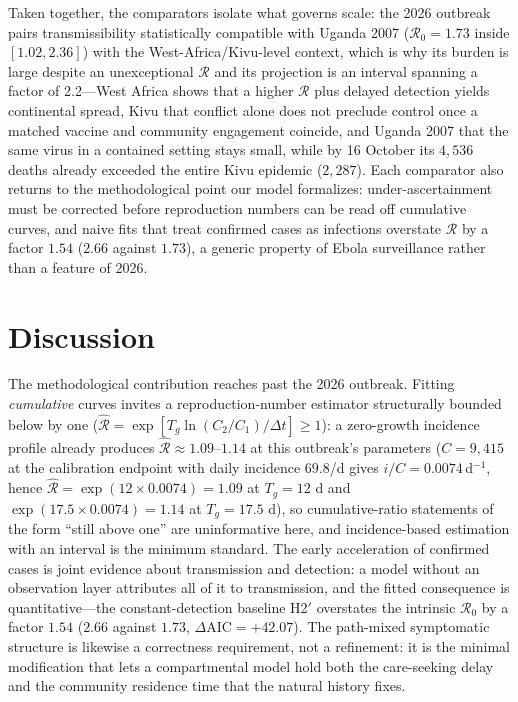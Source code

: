 \documentclass[preprint,12pt,numbers]{elsarticle}
\newcommand{\Reff}{\mathcal{R}}
\begin{document}
Taken together, the comparators isolate what governs scale: the 2026
outbreak pairs transmissibility statistically compatible with Uganda
2007 ($\Reff_0=1.73$ inside $[1.02,2.36]$) with the
West-Africa/Kivu-level context, which is why its burden is large despite
an unexceptional $\Reff$ and its projection is an interval spanning a
factor of 2.2---West Africa shows that a higher $\Reff$ plus delayed
detection yields continental spread, Kivu that conflict alone does not
preclude control once a matched vaccine and community engagement
coincide, and Uganda 2007 that the same virus in a contained setting
stays small, while by 16 October its $4{,}536$ deaths already exceeded
the entire Kivu epidemic ($2{,}287$). Each comparator also returns to
the methodological point our model formalizes: under-ascertainment must
be corrected before reproduction numbers can be read off cumulative
curves, and naive fits that treat confirmed cases as infections
overstate $\Reff$ by a factor $1.54$ ($2.66$ against $1.73$), a generic
property of Ebola surveillance rather than a feature of 2026.
\section{Discussion}\label{sec:discussion}

The methodological contribution reaches past the 2026 outbreak. Fitting
\emph{cumulative} curves invites a reproduction-number estimator
structurally bounded below by one
($\hat{\Reff}=\exp[T_g\ln(C_2/C_1)/\Delta t]\ge1$): a zero-growth
incidence profile already produces $\hat{\Reff}\approx1.09$--$1.14$ at
this outbreak's parameters ($C=9{,}415$ at the calibration endpoint
with daily incidence $69.8$/d gives $i/C=0.0074\,$d$^{-1}$, hence
$\hat{\Reff}=\exp(12\times0.0074)=1.09$ at $T_g=12$ d and
$\exp(17.5\times0.0074)=1.14$ at $T_g=17.5$ d), so cumulative-ratio
statements of the form ``still above one'' are uninformative here, and
incidence-based estimation with an interval is the minimum standard.
The early acceleration of confirmed cases is joint evidence about
transmission and detection: a model without an observation layer
attributes all of it to transmission, and the fitted consequence is
quantitative---the constant-detection baseline H2$'$ overstates the
intrinsic $\Reff_0$ by a factor $1.54$ ($2.66$ against $1.73$,
$\Delta\mathrm{AIC}=+42.07$). The path-mixed symptomatic structure is
likewise a correctness requirement, not a refinement: it is the minimal
modification that lets a compartmental model hold both the care-seeking
delay and the community residence time that the natural history fixes.
\end{document}
